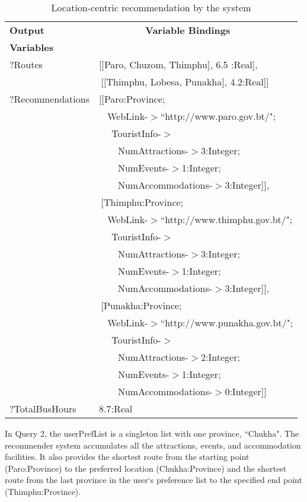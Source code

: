\begin{table} [tbph]
\caption{Location-centric recommendation by the system}
\centering
\footnotesize
\begin{tabular}{|l|l|}
\hline
 \textbf{Output} &$~~~~~~~~~~~~~~~~~~~~~~$\textbf{Variable Bindings} \\
 \textbf{Variables}&                \\
\hline
 $?$Routes  &[[Paro, Chuzom, Thimphu], 6.5 :Real],\\
           &$~$[[Thimphu, Lobesa, Punakha], 4.2:Real]]\\
 $?$Recommendations &[[Paro:Province;\\
  				    &$~~~~$WebLink-$>$``http://www.paro.gov.bt/"; \\
                   &$~~~~~~$TouristInfo-$>$\\
				   &$~~~~~~~~~$NumAttractions-$>$3:Integer; \\
		           &$~~~~~~~~~$NumEvents-$>$1:Integer; \\
			       &$~~~~~~~~~$NumAccommodations-$>$3:Integer]], \\
                   &$~$[Thimphu:Province; \\
  				    &$~~~~$WebLink-$>$``http://www.thimphu.gov.bt/"; \\
                   &$~~~~~~$TouristInfo-$>$\\
				   &$~~~~~~~~~$NumAttractions-$>$3:Integer; \\
		           &$~~~~~~~~~$NumEvents-$>$1:Integer; \\
			       &$~~~~~~~~~$NumAccommodations-$>$3:Integer]], \\
				   &$~$[Punakha:Province; \\
  				    &$~~~~$WebLink-$>$``http://www.punakha.gov.bt/"; \\
                   &$~~~~~~$TouristInfo-$>$\\
				   &$~~~~~~~~~$NumAttractions-$>$2:Integer; \\
		           &$~~~~~~~~~$NumEvents-$>$1:Integer; \\
			       &$~~~~~~~~~$NumAccommodations-$>$0:Integer]] \\
$?$TotalBusHours  &8.7:Real\\
\hline			   
\end{tabular} 
\end{table}         
\hspace{0.3in} In Query 2, the userPrefList is a singleton list with one province, ``Chukha". The recommender system accumulates all the attractions, events, and accommodation facilities. It also provides the shortest route from the starting point (Paro:Province) to the preferred location (Chukha:Province) and the shortest route from the last province in the user`s preference list to the specified end point (Thimphu:Province). 

